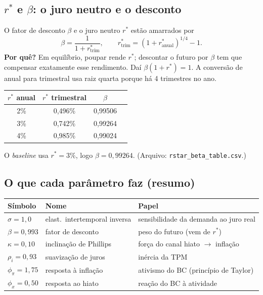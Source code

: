 \documentclass[11pt,a4paper]{article}
\begin{document}
\subsection{$r^\ast$ e $\beta$: o juro neutro e o desconto}
O fator de desconto $\beta$ e o juro neutro $r^\ast$ estão amarrados por
\[
\beta = \frac{1}{1+r^\ast_{\text{trim}}}, \qquad r^\ast_{\text{trim}} = (1+r^\ast_{\text{anual}})^{1/4}-1.
\]
\textbf{Por quê?} Em equilíbrio, poupar rende $r^\ast$; descontar o futuro por $\beta$ tem que
compensar exatamente esse rendimento. Daí $\beta(1+r^\ast)=1$. A conversão de anual para trimestral usa
raiz quarta porque há 4 trimestres no ano.

\begin{center}
\begin{tabular}{cccc}
\toprule
$r^\ast$ anual & $r^\ast$ trimestral & $\beta$ \\
\midrule
2\% & 0,496\% & 0,99506 \\
3\% & 0,742\% & 0,99264 \\
4\% & 0,985\% & 0,99024 \\
\bottomrule
\end{tabular}
\end{center}
O \emph{baseline} usa $r^\ast=3\%$, logo $\beta=0{,}99264$. (Arquivo: \texttt{rstar\_beta\_table.csv}.)

\subsection{O que cada parâmetro faz (resumo)}
\begin{center}
\begin{tabular}{lll}
\toprule
Símbolo & Nome & Papel \\
\midrule
$\sigma=1{,}0$ & elast.\ intertemporal inversa & sensibilidade da demanda ao juro real \\
$\beta=0{,}993$ & fator de desconto & peso do futuro (vem de $r^\ast$) \\
$\kappa=0{,}10$ & inclinação de Phillips & força do canal hiato $\to$ inflação \\
$\rho_i=0{,}93$ & suavização de juros & inércia da TPM \\
$\phi_\pi=1{,}75$ & resposta à inflação & ativismo do BC (princípio de Taylor) \\
$\phi_x=0{,}50$ & resposta ao hiato & reação do BC à atividade \\
\bottomrule
\end{tabular}
\end{center}
\end{document}

